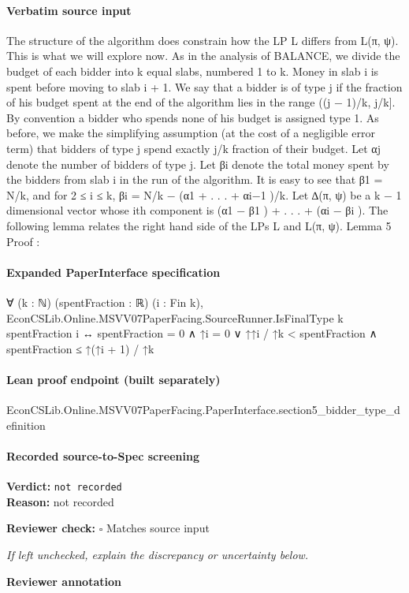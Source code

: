 \documentclass[10pt]{article}
\newcommand{\reviewerbox}{%
  \par\noindent\fbox{\parbox{0.96\linewidth}{\rule{0pt}{0.38in}}}\par
}
\newcommand{\reviewmatch}[1]{%
  \par\noindent\textbf{Reviewer check:} $\square$\; #1\par
  \noindent\emph{If left unchecked, explain the discrepancy or uncertainty below.}\par
}
\begin{document}
\paragraph{Verbatim source input}
\begin{ReviewVerbatim}
The structure of the algorithm does constrain how the LP L differs from L(π, ψ). This is what
we will explore now.
As in the analysis of BALANCE, we divide the budget of each bidder into k equal slabs,
numbered 1 to k. Money in slab i is spent before moving to slab i + 1. We say that a bidder
is of type j if the fraction of his budget spent at the end of the algorithm lies in the range
((j − 1)/k, j/k]. By convention a bidder who spends none of his budget is assigned type 1. As
before, we make the simplifying assumption (at the cost of a negligible error term) that bidders
of type j spend exactly j/k fraction of their budget. Let αj denote the number of bidders of
type j. Let βi denote the total money spent by the bidders from slab i in the run of the
algorithm. It is easy to see that β1 = N/k, and for 2 ≤ i ≤ k, βi = N/k − (α1 + . . . + αi−1 )/k.
Let ∆(π, ψ) be a k − 1 dimensional vector whose ith component is (α1 − β1 ) + . . . + (αi − βi ).
The following lemma relates the right hand side of the LPs L and L(π, ψ).
Lemma 5
Proof :
\end{ReviewVerbatim}


\paragraph{Expanded PaperInterface specification}
\begin{ReviewVerbatim}
∀ (k : ℕ) (spentFraction : ℝ) (i : Fin k),
  EconCSLib.Online.MSVV07PaperFacing.SourceRunner.IsFinalType k spentFraction i ↔
    spentFraction = 0 ∧ ↑i = 0 ∨ ↑↑i / ↑k < spentFraction ∧ spentFraction ≤ ↑(↑i + 1) / ↑k
\end{ReviewVerbatim}

\paragraph{Lean proof endpoint (built separately)}\begin{ReviewVerbatim}
EconCSLib.Online.MSVV07PaperFacing.PaperInterface.section5_bidder_type_definition
\end{ReviewVerbatim}

\paragraph{Recorded source-to-Spec screening}
\textbf{Verdict:} \texttt{not recorded}
\\
\textbf{Reason:} not recorded
\reviewmatch{Matches source input}
\noindent\textbf{Reviewer annotation}\par
\reviewerbox
\clearpage
\hypertarget{source-claim-4b12d3a25d5696f4}{}
\end{document}
